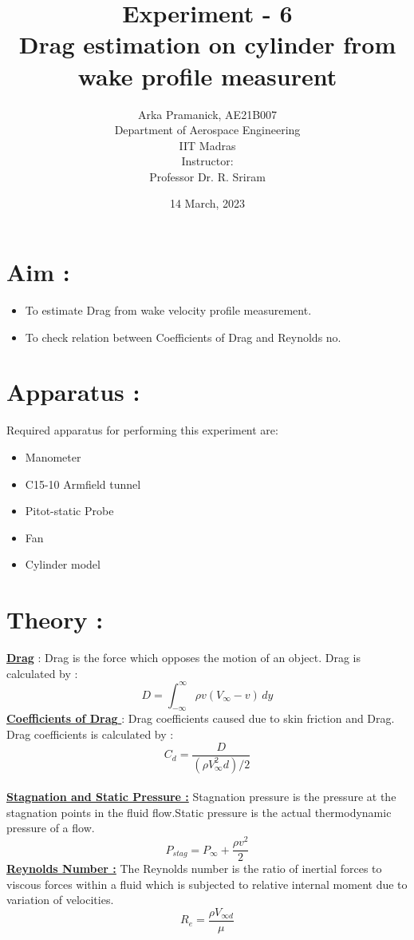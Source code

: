 \documentclass[12pt,a4paper]{article}
\title{{Experiment - 6\\ \textbf{Drag estimation on cylinder from wake profile measurent}}}
\author{Arka Pramanick, AE21B007\\ Department of Aerospace Engineering\\ IIT Madras\\[3ex] Instructor:\\ \large Professor Dr. R. Sriram}
\date{14 March, 2023}
\begin{document}
\maketitle

\hline

\section{Aim :}
\begin{itemize}
    \item To estimate Drag from wake velocity profile measurement.
    \item To check relation between Coefficients of Drag and Reynolds no.
\end{itemize}


\section{Apparatus :}
Required apparatus for performing this experiment are:
\begin{itemize}
    \item Manometer
    \item C15-10 Armfield tunnel
    \item Pitot-static Probe
    \item Fan
    \item Cylinder model
\end{itemize}



\newpage
\section{Theory :}

\underline{\textbf{Drag}} : Drag is the force which opposes the motion of an object.
Drag is calculated by : \\
$$D = \int_{-\infty}^{\infty} \rho v (V_{\infty}-v)\,dy $$
\underline{\textbf{Coefficients of Drag }} :
Drag coefficients caused due to skin friction and Drag. Drag coefficients is calculated by :
$$ C_d = \frac{D}{(\rho V_{\infty}^2 d)/2} $$ \\
\underline{\textbf{Stagnation and Static Pressure :}}
Stagnation pressure is the pressure at the stagnation points in the fluid flow.Static pressure is the actual thermodynamic pressure of a flow.
$$  P_{stag} = P_{\infty} + \frac{\rho v^2}{2} $$
\underline{\textbf{Reynolds Number :}}
The Reynolds number is the ratio of inertial forces to viscous forces within a fluid which is subjected to relative internal moment due to variation of velocities.
$$  R_e = \frac{\rho V_{\infty d}}{\mu} $$
\end{document}
